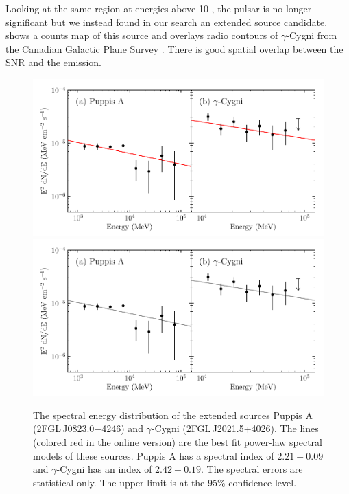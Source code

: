 Looking at the same region at energies above 10 \gev, the pulsar is
no longer significant but we instead found in our search an extended
source candidate.   shows a counts map
of this source and overlays radio contours of $\gamma$-Cygni from the
Canadian Galactic Plane Survey \citep{taylor_2003a_canadian-galactic}.
There is good spatial overlap between the SNR and the \gev emission.

\begin{figure}[htbp]
    \ifcolorfigure
      \includegraphics{chapters/extended_search/figures/summary_plots/snr_seds_color.pdf}
    \else
      \includegraphics{chapters/extended_search/figures/summary_plots/snr_seds_bw.pdf}
    \fi
    \caption{
    The spectral energy distribution of the extended sources 
    Puppis A (2FGL\,J0823.0$-$4246) and $\gamma$-Cygni 
    (2FGL\,J2021.5+4026).
    The lines (colored red in the online version)
    are the best fit power-law spectral models of
    these sources. Puppis A has a spectral index of
    $2.21\pm0.09$ and $\gamma$-Cygni has an
    index of $2.42\pm0.19$.
    The spectral errors are statistical only.
    The upper limit is at the 95\% confidence level.
    }
  \end{figure}


